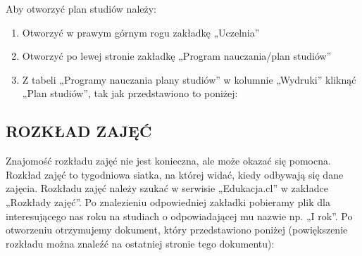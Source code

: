 \documentclass[11pt]{article}
\begin{document}
\vspace{0.1cm}

Aby otworzyć plan studiów należy:
\begin{enumerate}
    \item Otworzyć w prawym górnym rogu zakładkę „Uczelnia”
    \item Otworzyć po lewej stronie zakładkę „Program nauczania/plan studiów”
    \item Z tabeli „Programy nauczania plany studiów” w kolumnie „Wydruki” kliknąć „Plan studiów”, tak jak przedstawiono to poniżej:
    

\vspace{0.1cm}
\end{enumerate}
\subsection{ROZKŁAD ZAJĘĆ}
\indent \hspace{0.5cm} Znajomość rozkładu zajęć nie jest konieczna, ale może okazać się pomocna. Rozkład zajęć to tygodniowa siatka, na której widać, kiedy odbywają się dane zajęcia. Rozkładu zajęć należy szukać w serwisie „Edukacja.cl” w zakładce „Rozkłady zajęć”. Po znalezieniu odpowiedniej zakładki pobieramy plik dla interesującego nas roku na studiach o odpowiadającej mu nazwie np. „I rok”. Po otworzeniu otrzymujemy dokument, który przedstawiono poniżej (powiększenie rozkładu można znaleźć na ostatniej stronie tego dokumentu):\\
\end{document}
